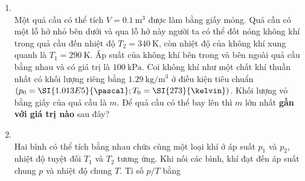 \begin{enumerate}[label=\bfseries Câu \arabic*:, leftmargin=1.7cm]
\item {}\\
Một quả cầu có thể tích $V=\SI{0.1}{\meter^3}$ được làm bằng giấy mỏng. Quả cầu có một lỗ hở nhỏ bên dưới và qua lỗ hở này người ta có thể đốt nóng không khí trong quả cầu đến nhiệt độ $T_2=\SI{340}{\kelvin}$, còn nhiệt độ của không khí xung quanh là $T_1=\SI{290}{\kelvin}$. Áp suất của không khí bên trong và bên ngoài quả cầu bằng nhau và có giá trị là $\SI{100}{\kilo\pascal}$. Coi không khí như một chất khí thuần nhất có khối lượng riêng bằng $\SI{1.29}{\kilogram/\meter^3}$ ở điều kiện tiêu chuẩn $\left(p_0=\SI{1.013E5}{\pascal}; T_0=\SI{273}{\kelvin}\right)$. Khối lượng vỏ bằng giấy của quả cầu là $m$. Để quả cầu có thể bay lên thì $m$ lớn nhất \textbf{gần với giá trị nào} sau đây?

\item {}\\
Hai bình có thể tích bằng nhau chứa cùng một loại khí ở áp suất $p_1$ và $p_2$, nhiệt độ tuyệt đối $T_1$ và $T_2$ tương ứng. Khi nối các bình, khí đạt đến áp suất chung $p$ và nhiệt độ chung $T$. Tỉ số $p/T$ bằng


\end{enumerate}
